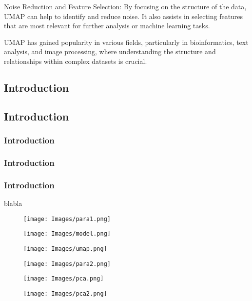 \documentclass[a4paper,12pt]{article}
\begin{document}
Noise Reduction and Feature Selection: By focusing on the structure of the data, UMAP can help to identify and reduce noise. It also assists in selecting features that are most relevant for further analysis or machine learning tasks.

UMAP has gained popularity in various fields, particularly in bioinformatics, text analysis, and image processing, where understanding the structure and relationships within complex datasets is crucial.
\subsection{Introduction}
\subsection{Introduction}
\subsubsection{Introduction}
\subsubsection{Introduction}
\subsubsection{Introduction}
blabla

\begin{figure}[H]
  \centering
  \texttt{[image: Images/para1.png]}
\end{figure}


\begin{figure}[H]
  \centering
  \texttt{[image: Images/model.png]}
\end{figure}


\begin{figure}[H]
  \centering
  \texttt{[image: Images/umap.png]}
\end{figure}

\begin{figure}[H]
  \centering
  \texttt{[image: Images/para2.png]}
\end{figure}

\begin{figure}[H]
  \centering
  \texttt{[image: Images/pca.png]}
\end{figure}

\begin{figure}[H]
  \centering
  \texttt{[image: Images/pca2.png]}
\end{figure}
\end{document}
